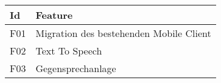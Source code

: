 \begin{table}[h]
    \centering
    \begin{tabular}{|l|p{15cm}|}
        \hline
        \textbf{Id} & \textbf{Feature}                                                                                                                                                             \\
        \hline
        F01           & Migration des bestehenden Mobile Client                                        \\
        \hline
        F02           & Text To Speech \\
        \hline
        F03           & Gegensprechanlage \\
        \hline
    \end{tabular}\label{tab:features}
\end{table}



\clearpage

